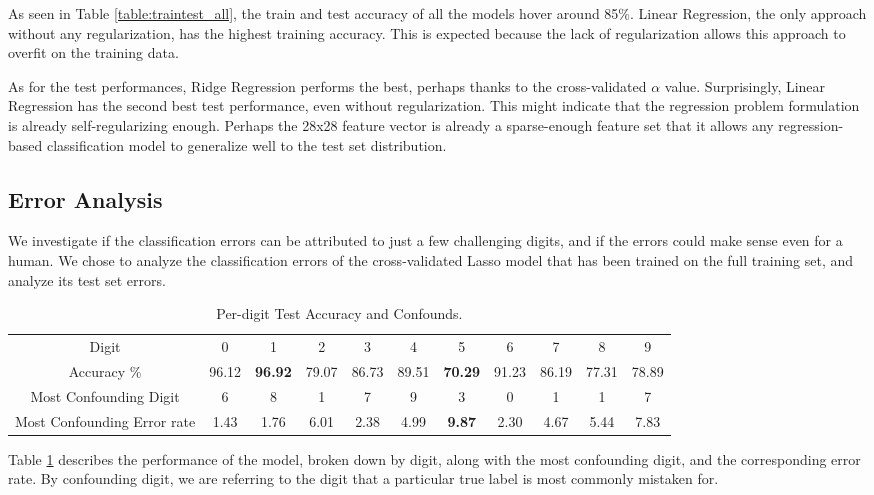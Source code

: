 \documentclass[letterpaper, 10 pt, conference]{ieeeconf}  %
\begin{document}
As seen in Table \ref{table:traintest_all}, the train and test accuracy of all the models hover around 85\%. Linear Regression, the only approach without any regularization, has the highest training accuracy. This is expected because the lack of regularization allows this approach to overfit on the training data.

As for the test performances, Ridge Regression performs the best, perhaps thanks to the cross-validated $\alpha$ value. Surprisingly, Linear Regression has the second best test performance, even without regularization. This might indicate that the regression problem formulation is already self-regularizing enough. Perhaps the 28x28 feature vector is already a sparse-enough feature set that it allows any regression-based classification model to generalize well to the test set distribution.

\subsection{Error Analysis}
We investigate if the classification errors can be attributed to just a few challenging digits, and if the errors could make sense even for a human. We chose to analyze the classification errors of the cross-validated Lasso model that has been trained on the full training set, and analyze its test set errors.

\begin{table}[t]
\caption{Per-digit Test Accuracy and Confounds.} %
\centering %
\begin{tabular}{c | c c c c c c c c c c } 
\hline\hline 

Digit & 0 & 1 & 2 & 3 & 4 & 5 & 6 & 7 & 8 & 9 \\
Accuracy \% & 96.12 & \textbf{96.92} & 79.07 & 86.73 & 89.51 & \textbf{70.29} & 91.23 & 86.19 & 77.31 & 78.89  \\
Most Confounding Digit & 6 & 8 & 1 & 7 & 9 & 3 & 0 & 1 & 1 & 7 \\
Most Confounding Error rate & 1.43 & 1.76 & 6.01 & 2.38 & 4.99 & \textbf{9.87} & 2.30 & 4.67 & 5.44 & 7.83 \\
\hline %
\end{tabular}
\label{table:per_digit_error} %
\end{table}

Table \ref{table:per_digit_error} describes the performance of the model, broken down by digit, along with the most confounding digit, and the corresponding error rate. By confounding digit, we are referring to the digit that a particular true label is most commonly mistaken for.
\end{document}
